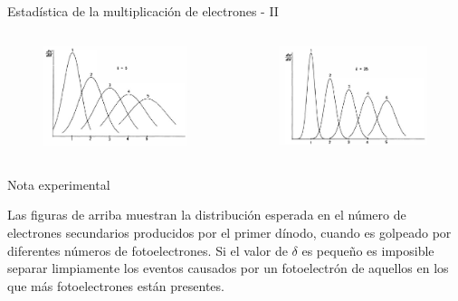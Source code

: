 \documentclass[a4paper,10pt]{beamer}
\begin{document}
\begin{frame}{Estadística de la multiplicación de electrones - II}
 \begin{columns}[c]
  
  \column{1.5in}
\begin{figure}
 \includegraphics[scale=0.35]{fig11}
\end{figure}
  \column{1.5in}
\begin{figure}
 \includegraphics[scale=0.35]{fig12}
\end{figure} 
 \end{columns}
 
 \begin{exampleblock}{Nota experimental}
  \begin{justify}
  \begin{footnotesize}
   Las figuras de arriba muestran la distribución esperada en el número de 
   electrones secundarios producidos por el primer dínodo, cuando es golpeado 
   por diferentes números de fotoelectrones. Si el valor de $\delta$ es pequeño 
   es imposible separar limpiamente los eventos causados por un fotoelectrón de 
   aquellos en los que más fotoelectrones están presentes.
   \end{footnotesize}
   \end{justify}
 \end{exampleblock}
\end{frame}
\end{document}
